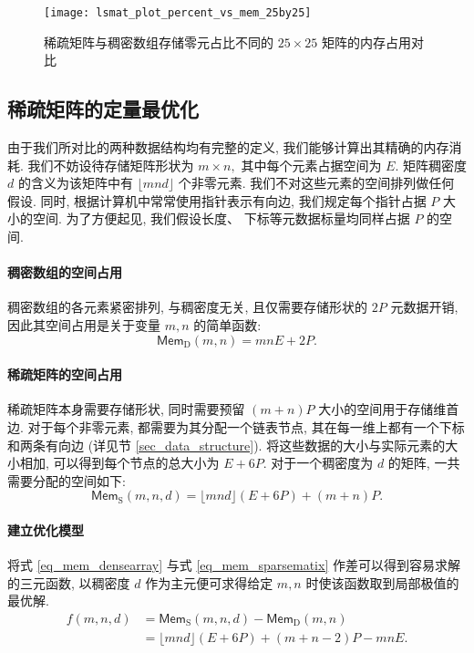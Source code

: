 \begin{figure}
    \centering
    \texttt{[image: lsmat\_plot\_percent\_vs\_mem\_25by25]}
    \caption{稀疏矩阵与稠密数组存储零元占比不同的 $25 \times 25$ 矩阵的内存占用对比}
    \label{fig_lsmat_plot_percent_vs_mem_25by25}
\end{figure}

\subsection{稀疏矩阵的定量最优化}

由于我们所对比的两种数据结构均有完整的定义, 我们能够计算出其精确的内存消耗. 我们不妨设待存储矩阵形状为 $m \times n,$ 其中每个元素占据空间为 $E.$ 矩阵稠密度 $d$ 的含义为该矩阵中有 $\lfloor mnd \rfloor$ 个非零元素. 我们不对这些元素的空间排列做任何假设. 同时, 根据计算机中常常使用指针表示有向边, 我们规定每个指针占据 $P$ 大小的空间. 为了方便起见, 我们假设长度、 下标等元数据标量均同样占据 $P$ 的空间.

\newcommand{\Mem}[2]{\mathsf{Mem}_{\mathrm{#1}}(#2)}

\paragraph{稠密数组的空间占用} 稠密数组的各元素紧密排列, 与稠密度无关, 且仅需要存储形状的 $2P$ 元数据开销, 因此其空间占用是关于变量 $m, n$ 的简单函数:
\begin{equation}
    \Mem{D}{m, n} = mnE + 2P.
    \label{eq_mem_densearray}
\end{equation}

\paragraph{稀疏矩阵的空间占用} 稀疏矩阵本身需要存储形状, 同时需要预留 $(m + n)P$ 大小的空间用于存储维首边. 对于每个非零元素, 都需要为其分配一个链表节点, 其在每一维上都有一个下标和两条有向边 (详见节 \ref{sec_data_structure}). 将这些数据的大小与实际元素的大小相加, 可以得到每个节点的总大小为 $E + 6P.$ 对于一个稠密度为 $d$ 的矩阵, 一共需要分配的空间如下:
\begin{equation}
    \Mem{S}{m, n, d} = \lfloor mnd \rfloor(E + 6P) + (m + n)P.
    \label{eq_mem_sparsematix}
\end{equation}

\paragraph{建立优化模型} 将式 \ref{eq_mem_densearray} 与式 \ref{eq_mem_sparsematix} 作差可以得到容易求解的三元函数, 以稠密度 $d$ 作为主元便可求得给定 $m, n$ 时使该函数取到局部极值的最优解.
\begin{equation}
    \begin{aligned}
        f(m, n, d) & = \Mem{S}{m, n, d} - \Mem{D}{m, n}\\
        & = \lfloor mnd \rfloor(E + 6P) + (m + n - 2)P - mnE.\\
    \end{aligned}
    \label{eq_mem_optim_goal}
\end{equation}

